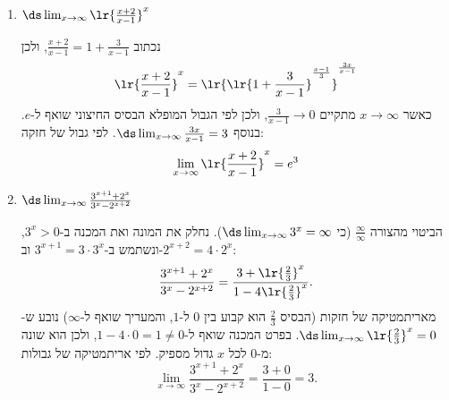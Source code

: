 \begin{enumerate}
\ifsol
{}
\begin{solbox}
ניעזר בחוקי לוגריתמים ונקבל
\begin{align*}
    (2x+3)\lr{\ln(x + 2) - \ln(x)}=(2x+3)\ln(1+\tfrac{2}{x})
    = \ln\left((1+\tfrac{2}{x})^{2x+3}\right)
    \end{align*}
    הביטוי בתוך ה-$\ln$ דומה לגבול המופלא המוכר, ולכן נמשיך לפשט רק אותו  ה-$\ln$-
    \begin{align*}
    (1+\tfrac{2}{x})^{2x+3}
    &=\ (1+\tfrac{2}{x})^{{\color{red}\frac{x}{2}}\cdot(2x+3)\cdot{\color{red}\frac{2}{x}}}\\
    &=\ (1+\tfrac{2}{x})^{{\frac{x}{2}}\cdot{(4+\tfrac{6}{x})}}
\end{align*}
לכן
\begin{align*}
    \lim_{x\to\infty}(2x+3)\lr{\ln(x + 2) - \ln(x)}&=\ \lim_{x\to\infty}(4+\tfrac{6}{x})\ln(1+\tfrac{2}{x})^{\frac{x}{2}}\\
    &=\ 4\cdot\ln e
    = 4.
\end{align*}
הערה: בחישוב הגבול השתמשנו באריתמטיקה של גבולות: הגבול של מכפלה של פונקציות מתכנסות שווה למכפלת הגבולות.
\end{solbox}
\fi

\item $\ds\lim_{x\to\infty}\lr{\frac{x+2}{x-1}}^{x}$
\ifsol
\begin{solbox}
נכתוב $\frac{x+2}{x-1}=1+\frac{3}{x-1}$, ולכן
\[\lr{\frac{x+2}{x-1}}^{x}=\lr{\lr{1+\frac{3}{x-1}}^{\frac{x-1}{3}}}^{\frac{3x}{x-1}}\]
כאשר $x\to\infty$ מתקיים $\frac{3}{x-1}\to0$, ולכן לפי הגבול המופלא הבסיס החיצוני שואף ל-$e$. בנוסף $\ds\lim_{x\to\infty}\frac{3x}{x-1}=3$. לפי גבול של חזקה:
\[\lim_{x\to\infty}\lr{\frac{x+2}{x-1}}^{x}=e^3\]
\end{solbox}
\fi

\item $\ds\lim_{x\to\infty}\frac{3^{x+1}+2^{x}}{3^{x}-2^{x+2}}$
\ifsol
{}
\begin{solbox}
הביטוי מהצורה $\frac{\infty}{\infty}$ (כי $\ds\lim_{x\to\infty}3^x=\infty$). נחלק את המונה ואת המכנה ב-$3^x>0$, ונשתמש ב-$3^{x+1}=3\cdot3^x$ וב-$2^{x+2}=4\cdot2^x$:
\[\frac{3^{x+1}+2^{x}}{3^{x}-2^{x+2}}=\frac{3+\lr{\frac23}^x}{1-4\lr{\frac23}^x}.\]
מאריתמטיקה של חזקות (הבסיס $\frac23$ הוא קבוע בין $0$ ל-$1$, והמעריך שואף ל-$\infty$) נובע ש-$\ds\lim_{x\to\infty}\lr{\frac23}^x=0$.
בפרט המכנה שואף ל-$1-4\cdot0=1\ne0$, ולכן הוא שונה מ-$0$ לכל $x$ גדול מספיק. לפי אריתמטיקה של גבולות:
\[\lim_{x\to\infty}\frac{3^{x+1}+2^{x}}{3^{x}-2^{x+2}}=\frac{3+0}{1-0}=3.\]
\end{solbox}
\fi


\end{enumerate}

